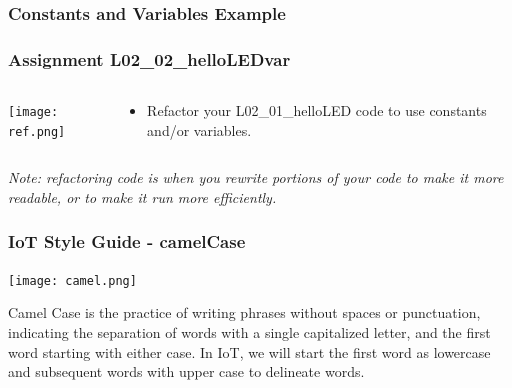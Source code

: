 \documentclass{beamer}
\begin{document}

\begin{frame}\frametitle{Constants and Variables Example}
\lstcv
\end{frame}



\begin{frame}\frametitle{Assignment L02\_02\_helloLEDvar}
\begin{columns}
\begin{column}{4cm}
\begin{center}
\texttt{[image: ref.png]}
\end{center}
\end{column}
\begin{column}{6cm}
\begin{itemize}
\item Refactor your L02\_01\_helloLED code to use constants and/or variables.
\end{itemize}
\end{column}
\end{columns}

\vspace{.5cm}

\emph{Note: refactoring code is when you rewrite portions of your code to make it more readable, or to make it run more efficiently.}
\end{frame}

\begin{frame}\frametitle{IoT Style Guide - camelCase}
\begin{center}
\texttt{[image: camel.png]}
\end{center}

Camel Case is the practice of writing phrases without spaces or punctuation, indicating the separation of words with a single capitalized letter, and the first word starting with either case. In IoT, we will start the first word as lowercase and subsequent words with upper case to delineate words. 
\end{frame}
\end{document}
